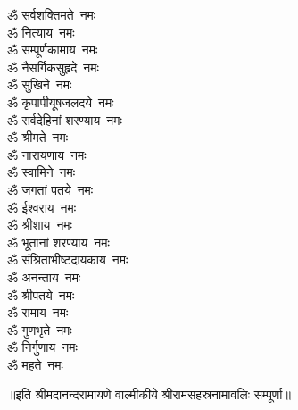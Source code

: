 \begin{multicols}{2}
\begin{flushleft}
ॐ सर्वशक्तिमते~नमः\\
ॐ नित्याय~नमः\\
ॐ सम्पूर्णकामाय~नमः\hfill{}\\
ॐ नैसर्गिकसुहृदे~नमः\\
ॐ सुखिने~नमः\\
ॐ कृपापीयूषजलदये~नमः\\
ॐ सर्वदेहिनां शरण्याय~नमः\\
ॐ श्रीमते~नमः\\
ॐ नारायणाय~नमः\\
ॐ स्वामिने~नमः\\
ॐ जगतां पतये~नमः\\
ॐ ईश्वराय~नमः\\
ॐ श्रीशाय~नमः\hfill{}\\
ॐ भूतानां शरण्याय~नमः\\
ॐ संश्रिताभीष्टदायकाय~नमः\\
ॐ अनन्ताय~नमः\\
ॐ श्रीपतये~नमः\\
ॐ रामाय~नमः\\
ॐ गुणभृते~नमः\\
ॐ निर्गुणाय~नमः\\
ॐ महते~नमः\\
\end{flushleft}
\end{multicols}
\centerline{॥इति श्रीमदानन्दरामायणे वाल्मीकीये श्रीरामसहस्रनामावलिः सम्पूर्णा॥}
